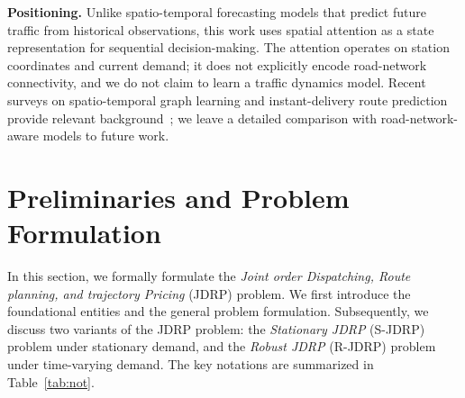 \documentclass[lettersize,journal]{IEEEtran}
\begin{document}
\textbf{Positioning.} Unlike spatio-temporal forecasting models that predict future traffic from historical observations, this work uses spatial attention as a state representation for sequential decision-making. The attention operates on station coordinates and current demand; it does not explicitly encode road-network connectivity, and we do not claim to learn a traffic dynamics model. Recent surveys on spatio-temporal graph learning and instant-delivery route prediction provide relevant background~\cite{ref:Jin2024STGNN, ref:Jin2023Dilated, ref:Wen2024Instant}; we leave a detailed comparison with road-network-aware models to future work.

\section{Preliminaries and Problem Formulation}
\label{sec:problem}

In this section, we formally formulate the \textit{Joint order Dispatching, Route planning, and trajectory Pricing} (JDRP) problem. We first introduce the foundational entities and the general problem formulation. Subsequently, we discuss two variants of the JDRP problem: the \textit{Stationary JDRP} (S-JDRP)~\cite{ref:odrp} problem under stationary demand, and the \textit{Robust JDRP} (R-JDRP) problem under time-varying demand. The key notations are summarized in Table~\ref{tab:not}.


\end{document}
